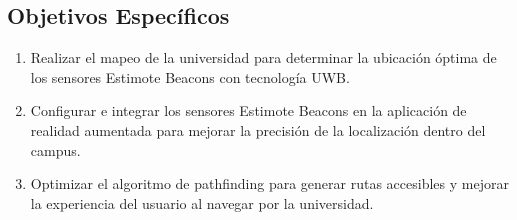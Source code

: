 \documentclass{article}
\begin{document}
\subsection{Objetivos Específicos}
\begin{enumerate}[label=\thesubsection.\arabic*]
    \item Realizar el mapeo de la universidad para determinar la ubicación óptima de los sensores Estimote Beacons con tecnología UWB.
    \item Configurar e integrar los sensores Estimote Beacons en la aplicación de realidad aumentada para mejorar la precisión de la 
    localización dentro del campus.
    \item Optimizar el algoritmo de pathfinding para generar rutas accesibles y mejorar la experiencia del usuario al navegar por la 
    universidad.
\end{enumerate}
\end{document}
